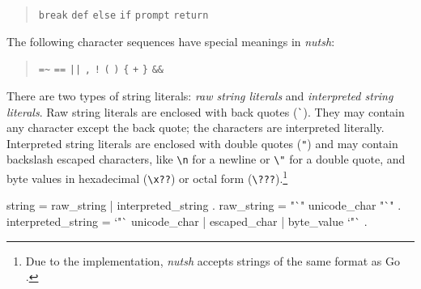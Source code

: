 \documentclass[paper=a4,twoside,abstract=on,cleardoublepage=empty,numbers=noenddot,toc=bib,12pt,appendixprefix=true]{scrreprt}
\begin{document}
\begin{quote}
    \texttt{break}\hspace{0.5em}
    \texttt{def}\hspace{0.5em}
    \texttt{else}\hspace{0.5em}
    \texttt{if}\hspace{0.5em}
    \texttt{prompt}\hspace{0.5em}
    \texttt{return}
\end{quote}


The following character sequences have special meanings in \emph{nutsh}:

\begin{quote}
    \texttt{=\~}\hspace{1em}
    \texttt{==}\hspace{1em}
    \texttt{||}\hspace{1em}
    \texttt{,}\hspace{1em}
    \texttt{!}\hspace{1em}
    \texttt{(}\hspace{1em}
    \texttt{)}\hspace{1em}
    \texttt{\{}\hspace{1em}
    \texttt{+}\hspace{1em}
    \texttt{\}}\hspace{1em}
    \texttt{\&\&}
\end{quote}


There are two types of string literals: \emph{raw string literals} and \emph{interpreted string literals}. Raw string literals are enclosed with back quotes (\texttt{\`}). They may contain any character except the back quote; the characters are interpreted literally. Interpreted string literals are enclosed with double quotes (\texttt{"}) and may contain backslash escaped characters, like \texttt{\textbackslash{}n} for a newline or \texttt{\textbackslash{}"} for a double quote, and byte values in hexadecimal (\texttt{\textbackslash{}x??}) or octal form (\texttt{\textbackslash{}???}).\footnote{Due to the implementation, \emph{nutsh} accepts strings of the same format as Go \cite{google13}.}

\begin{ebnf}
string = raw_string | interpreted_string .
raw_string = "`" { unicode_char } "`" .
interpreted_string = `"` { unicode_char | escaped_char |
    byte_value } `"` .
\end{ebnf}
\end{document}
